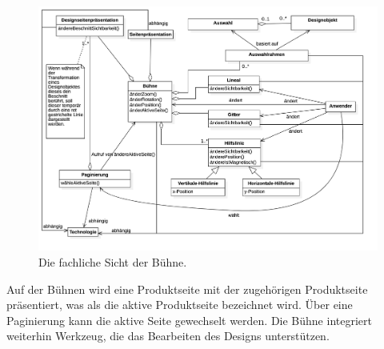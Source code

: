 \begin{figure}[H]
    \centering
    \caption{Die fachliche Sicht der Bühne.}
    \label{fig:dm-editor}
    \includegraphics[width=1\textwidth]{diagrams/Soll-Architektur/DM-Editor.png}
\end{figure}
Auf der Bühnen wird eine Produktseite mit der zugehörigen Produktseite präsentiert, was als die aktive Produktseite bezeichnet wird. Über eine Paginierung kann die aktive Seite gewechselt werden. Die Bühne integriert weiterhin Werkzeug, die das Bearbeiten des Designs unterstützen. 